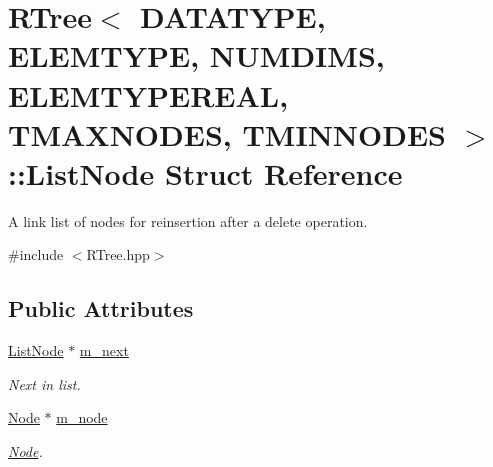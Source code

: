 \hypertarget{struct_r_tree_1_1_list_node}{\section{\-R\-Tree$<$ \-D\-A\-T\-A\-T\-Y\-P\-E, \-E\-L\-E\-M\-T\-Y\-P\-E, \-N\-U\-M\-D\-I\-M\-S, \-E\-L\-E\-M\-T\-Y\-P\-E\-R\-E\-A\-L, \-T\-M\-A\-X\-N\-O\-D\-E\-S, \-T\-M\-I\-N\-N\-O\-D\-E\-S $>$\-:\-:\-List\-Node \-Struct \-Reference}
\label{struct_r_tree_1_1_list_node}
}


\-A link list of nodes for reinsertion after a delete operation.  




{\ttfamily \#include $<$\-R\-Tree.\-hpp$>$}

\subsection*{\-Public \-Attributes}
\begin{DoxyCompactItemize}
\item 
\hypertarget{struct_r_tree_1_1_list_node_a9812899d8953b03f1772522b668942e3}{\hyperlink{struct_r_tree_1_1_list_node}{\-List\-Node} $\ast$ \hyperlink{struct_r_tree_1_1_list_node_a9812899d8953b03f1772522b668942e3}{m\-\_\-next}}\label{struct_r_tree_1_1_list_node_a9812899d8953b03f1772522b668942e3}

\begin{DoxyCompactList}\small\item\em \-Next in list. \end{DoxyCompactList}\item 
\hypertarget{struct_r_tree_1_1_list_node_ade4b7e322e04e0a71b4e14cde8e73dca}{\hyperlink{struct_r_tree_1_1_node}{\-Node} $\ast$ \hyperlink{struct_r_tree_1_1_list_node_ade4b7e322e04e0a71b4e14cde8e73dca}{m\-\_\-node}}\label{struct_r_tree_1_1_list_node_ade4b7e322e04e0a71b4e14cde8e73dca}

\begin{DoxyCompactList}\small\item\em \hyperlink{struct_r_tree_1_1_node}{\-Node}. \end{DoxyCompactList}\end{DoxyCompactItemize}


